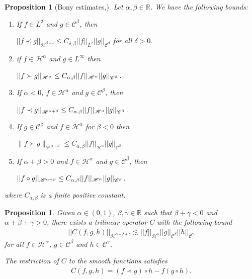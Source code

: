 \documentclass[11pt, oneside]{article}   	%
\newtheorem{proposition}[theorem]{Proposition}
\newcommand{\CC}{\mathscr{C}}
\newcommand{\ssp}{\mathscr{H}}
\begin{document}
\begin{proposition}[Bony estimates,\cite{allez_continuous_2015}]
	\label{lem:paraest} Let $\alpha, \beta \in \mathbb{R}$. We
	have the following bounds:
	\begin{enumerate}
		\item If $f \in L^2$ and $g \in \CC^{\beta}$, then
		
		$|| f \prec g ||_{\ssp^{\beta - \delta}} \leq C_{\delta, \beta} || f
		||_{L^2} || g ||_{\CC^{\beta}} 
		$ 
		for all $\delta > 0$.
		
		\item if $f \in \ssp^{\alpha}$ and $g \in L^{\infty}$ then
		
		$
		|| f \succ g ||_{\ssp^{\alpha}} \leq C_{\alpha, \beta} || f ||_{\ssp^{\alpha}}
		|| g ||_{\CC^{\beta}} \hspace{0.17em} .
		$
		
		\item If $\alpha < 0$, $f \in \ssp^{\alpha}$ and $g \in \CC^{\beta}$,
		then
		
		$
		|| f \prec g ||_{\ssp^{\alpha + \beta}} \leq C_{\alpha, \beta} || f
		||_{\ssp^{\alpha}} || g ||_{\CC^{\beta}} \hspace{0.17em} .
		$
		
		\item If $g \in \mathscr{C}^{\beta}$ and $f \in \ssp^{\alpha}$ for $\beta <
		0$ then
		
		$
		\|f \succ g\|_{\ssp^{\alpha + \beta}} \leq C_{\alpha, \beta} || f
		||_{\ssp^{\alpha}} || g ||_{\CC^{\beta}}
		$
		
		\item If $\alpha + \beta > 0$ and $f \in \ssp^{\alpha}$ and $g \in
		\CC^{\beta}$, then
		
		$
		| | f \circ g ||_{\ssp^{\alpha + \beta}} \leq
		C_{\alpha, \beta} || f ||_{\ssp^{\alpha}} || g ||_{\CC^{\beta}}
		\hspace{0.17em} .
		$
	\end{enumerate}
	where $C_{\alpha, \beta}$ is a finite positive constant.
\end{proposition}
\begin{proposition}
	\label{prop:commu} Given $\alpha \in (0, 1)$, $\beta, \gamma \in \mathbb{R}$
	such that $\beta + \gamma < 0$ and $\alpha + \beta + \gamma > 0$, 
	there exists a  trilinear operator $C$ with the following bound
	\begin{align*}
	|| C (f, g, h) ||_{\ssp^{\alpha + \beta + \gamma}} \lesssim || f
	||_{\ssp^{\alpha}} || g ||_{\CC^{\beta}} || h
	||_{\CC^{\gamma}}
	\end{align*}
	for all $f \in \ssp^{\alpha}$, $g \in \CC^{\beta}$ and $h \in
	\CC^{\gamma}$.
	
	The restriction of $C$  to the smooth functions satisfies 
	\begin{align*}
	C (f, g, h) = (f \prec g) \circ h - f (g \circ h).
	\end{align*}
	
\end{proposition}
\end{document}
